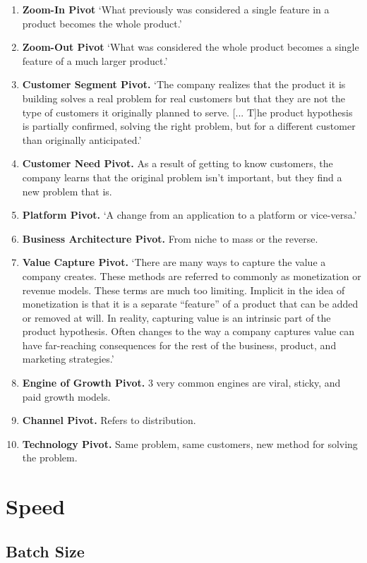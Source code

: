 \documentclass[11pt, oneside]{article}   	%
\begin{document}
\begin{enumerate}
\item \textbf{Zoom-In Pivot} `What previously was considered a single feature in a product becomes the whole product.'
\item \textbf{Zoom-Out Pivot} `What was considered the whole product becomes a single feature of a much larger product.'
\item \textbf{Customer Segment Pivot.}  `The company realizes that the product it is building solves a real problem for real customers but that they are not the type of customers it originally planned to serve.  [... T]he product hypothesis is partially confirmed, solving the right problem, but for a different customer than originally anticipated.'  
\item \textbf{Customer Need Pivot.}  As a result of getting to know customers, the company learns that the original problem isn't important, but they find a new problem that is.
\item \textbf{Platform Pivot.}  `A change from an application to a platform or vice-versa.'
\item \textbf{Business Architecture Pivot.}  From niche to mass or the reverse.
\item \textbf{Value Capture Pivot.} `There are many ways to capture the value a company creates.  These methods are referred to commonly as monetization or revenue models.  These terms are much too limiting.  Implicit in the idea of monetization is that it is a separate ``feature'' of a product that can be added or removed at will.  In reality, capturing value is an intrinsic part of the product hypothesis.  Often changes to the way a company captures value can have far-reaching consequences for the rest of the business, product, and marketing strategies.'  
\item \textbf{Engine of Growth Pivot.}  3 very common engines are viral, sticky, and paid growth models.
\item \textbf{Channel Pivot.}  Refers to distribution.
\item \textbf{Technology Pivot.} Same problem, same customers, new method for solving the problem. 
\end{enumerate}

\section{Speed}

\subsection{Batch Size}
\end{document}

